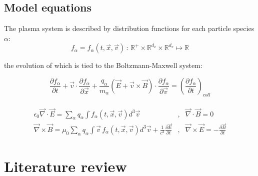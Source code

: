 \documentclass{beamer}
\begin{document}
\subsection{Model equations}


\begin{frame}{\subsecname} %
The plasma system is described by distribution functions for each particle species $\alpha$:
$$f_{\alpha} = f_{\alpha}(t,\vec{x},\vec{v}) \, : \, \mathbb{R}^+ \times \mathbb{R}^{d_x} \times \mathbb{R}^{d_v} \mapsto \mathbb{R}$$

the evolution of which is tied to the Boltzmann-Maxwell system:

\begin{equation*}
\frac{\partial f_{\alpha}}{\partial t} + \vec{v}\cdot \frac{\partial f_{\alpha}}{\partial \vec{x}} + \frac{q_{\alpha}}{m_{\alpha}}\left( \vec{E} + \vec{v} \times \vec{B}\right)\cdot \frac{\partial f_{\alpha}}{\partial \vec{v}}  =  \left(\frac{\partial f_{\alpha}}{\partial t}\right)_{coll}\end{equation*}\\[0.9em]
\vspace{-1em}
\begin{eqnarray*}
\epsilon_0\vec{\nabla}\cdot \vec{E} =\sum_{\alpha} q_{\alpha}\int f_{\alpha}(t,\vec{x},\vec{v}) d^3\vec{v} \,\, &,& \vec{\nabla}\cdot\vec{B} = 0\\
\vec{\nabla} \times \vec{B} = \mu_0\sum_{\alpha} q_{\alpha} \int \vec{v}\,f_{\alpha}(t,\vec{x},\vec{v}) d^3\vec{v} + \frac{1}{c^2}\frac{\partial\vec{E}}{\partial t} &,& \vec{\nabla}\times\vec{E} = -\frac{\partial\vec{B}}{\partial t} \label{eq:Maxwell34}
\end{eqnarray*} 

\end{frame}




\section{Literature review}
\end{document}
